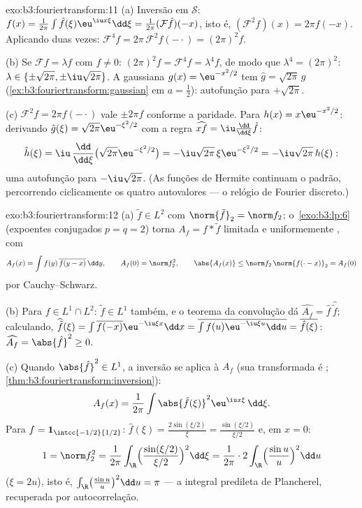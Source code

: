 \begin{solution}{exo:b3:fouriertransform:11}
(a) Inversão em $\mathcal S$: $f(x) =
\frac1{2\pi}\int\hat f(\xi)\eu^{\iu x\xi}\dd\xi =
\frac1{2\pi}(\mathcal F\hat f)(-x)$, isto é, $(\mathcal
F^2f)(x) = 2\pi f(-x)$. Aplicando duas vezes: $\mathcal F^4f =
2\pi\,\mathcal F^2f(-\cdot) = (2\pi)^2f$.

(b) Se $\mathcal Ff = \lambda f$ com $f \neq 0$:
$(2\pi)^2f = \mathcal F^4f = \lambda^4f$, de modo que $\lambda^4 =
(2\pi)^2$: $\lambda \in \{\pm\sqrt{2\pi},
\pm\iu\sqrt{2\pi}\}$. A gaussiana $g(x) = \eu^{-x^2/2}$ tem
$\hat g = \sqrt{2\pi}\,g$
(\cref{ex:b3:fouriertransform:gaussian} em $a = \frac12$):
autofunção para $+\sqrt{2\pi}$.

(c) $\mathcal F^2f = 2\pi f(-\cdot)$ vale $\pm2\pi f$
conforme a paridade. Para $h(x) = x\eu^{-x^2/2}$:
derivando $\hat g(\xi) = \sqrt{2\pi}\eu^{-\xi^2/2}$
com a regra $\widehat{xf} = \iu\frac{\dd}{\dd\xi}\hat f$:
\[
\hat h(\xi) = \iu\,\frac{\dd}{\dd\xi}\bigl(\sqrt{2\pi}
\eu^{-\xi^2/2}\bigr) = -\iu\sqrt{2\pi}\,\xi\eu^{-\xi^2/2}
= -\iu\sqrt{2\pi}\,h(\xi) :
\]
uma autofunção para $-\iu\sqrt{2\pi}$. (As funções de Hermite
continuam o padrão, percorrendo ciclicamente os quatro
autovalores --- o relógio de Fourier discreto.)

\end{solution}

\begin{solution}{exo:b3:fouriertransform:12}
(a) $\tilde f \in L^2$ com $\norm{\tilde f}_2 = \norm f_2$;
o~\cref{exo:b3:lp:6} (expoentes conjugados $p = q = 2$) torna
$A_f = f * \tilde f$ limitada e uniformemente , com
\[
A_f(x) = \int f(y)\,\overline{f(y - x)}\,\dd y,
\qquad A_f(0) = \norm f_2^2,
\qquad \abs{A_f(x)} \leq \norm f_2\,\norm{f(\cdot -
x)}_2 = A_f(0)
\]
por Cauchy--Schwarz.

(b) Para $f \in L^1\cap L^2$: $\tilde f \in L^1$ também, e o
teorema da convolução dá $\widehat{A_f} = \hat f\,
\widehat{\tilde f}$; calculando, $\widehat{\tilde f}(\xi) =
\int\overline{f(-x)}\eu^{-\iu\xi x}\dd x =
\overline{\int f(u)\eu^{-\iu\xi u}\dd u} =
\overline{\hat f(\xi)}$: $\widehat{A_f} = \abs{\hat f}^2
\geq 0$.

(c) Quando $\abs{\hat f}^2 \in L^1$, a inversão se aplica à
 $A_f$ (sua transformada é ;
\cref{thm:b3:fouriertransform:inversion}):
\[
A_f(x) = \frac1{2\pi}\int\abs{\hat f(\xi)}^2
\eu^{\iu x\xi}\,\dd\xi .
\]
Para $f = \mathbf 1_{\intcc{-1/2}{1/2}}$: $\hat f(\xi) =
\frac{2\sin(\xi/2)}\xi = \frac{\sin(\xi/2)}{\xi/2}$ e, em
$x = 0$:
\[
1 = \norm f_2^2 = \frac1{2\pi}\int_\R
\Bigl(\frac{\sin(\xi/2)}{\xi/2}\Bigr)^2\dd\xi
= \frac1{2\pi}\cdot2\int_\R\Bigl(\frac{\sin u}u\Bigr)^2\dd u
\]
($\xi = 2u$), isto é, $\int_\R\bigl(\frac{\sin u}u\bigr)^2\dd
u = \pi$ --- a integral predileta de Plancherel, recuperada por
autocorrelação.
\end{solution}

